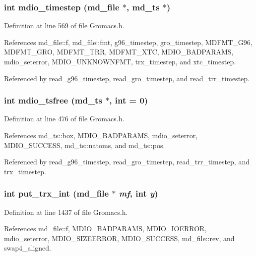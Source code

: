 \subsubsection{\setlength{\rightskip}{0pt plus 5cm}int mdio\_\-timestep ({\bf md\_\-file} $\ast$, {\bf md\_\-ts} $\ast$)\hspace{0.3cm}{\tt  [static]}}\label{Gromacs_8h_a39}




Definition at line 569 of file Gromacs.h.

References md\_\-file::f, md\_\-file::fmt, g96\_\-timestep, gro\_\-timestep, MDFMT\_\-G96, MDFMT\_\-GRO, MDFMT\_\-TRR, MDFMT\_\-XTC, MDIO\_\-BADPARAMS, mdio\_\-seterror, MDIO\_\-UNKNOWNFMT, trx\_\-timestep, and xtc\_\-timestep.

Referenced by read\_\-g96\_\-timestep, read\_\-gro\_\-timestep, and read\_\-trr\_\-timestep.
\subsubsection{\setlength{\rightskip}{0pt plus 5cm}int mdio\_\-tsfree ({\bf md\_\-ts} $\ast$, int = 0)\hspace{0.3cm}{\tt  [static]}}\label{Gromacs_8h_a62}




Definition at line 476 of file Gromacs.h.

References md\_\-ts::box, MDIO\_\-BADPARAMS, mdio\_\-seterror, MDIO\_\-SUCCESS, md\_\-ts::natoms, and md\_\-ts::pos.

Referenced by read\_\-g96\_\-timestep, read\_\-gro\_\-timestep, read\_\-trr\_\-timestep, and trx\_\-timestep.
\subsubsection{\setlength{\rightskip}{0pt plus 5cm}int put\_\-trx\_\-int ({\bf md\_\-file} $\ast$ {\em mf}, int {\em y})\hspace{0.3cm}{\tt  [static]}}\label{Gromacs_8h_a66}




Definition at line 1437 of file Gromacs.h.

References md\_\-file::f, MDIO\_\-BADPARAMS, MDIO\_\-IOERROR, mdio\_\-seterror, MDIO\_\-SIZEERROR, MDIO\_\-SUCCESS, md\_\-file::rev, and swap4\_\-aligned.

